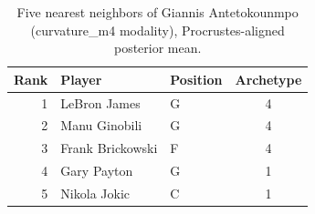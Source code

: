 \begin{table}[htbp]
  \centering\small
  \begin{tabular}{rllc}
    \toprule
    Rank & Player & Position & Archetype \\
    \midrule
    1 & LeBron James & G & 4 \\
    2 & Manu Ginobili & G & 4 \\
    3 & Frank Brickowski & F & 4 \\
    4 & Gary Payton & G & 1 \\
    5 & Nikola Jokic & C & 1 \\
    \bottomrule
  \end{tabular}
  \caption{Five nearest neighbors of Giannis Antetokounmpo (curvature_m4 modality), Procrustes-aligned posterior mean.}
  \label{tab:Giannis_Antetokounmpo_neighbors_curvature_m4}
\end{table}

